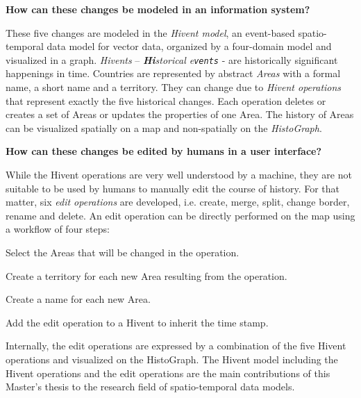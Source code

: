 \begin{description}[labelindent=0.1em]
  \item[\textbf{2a)}]
  \textbf{
    How can these changes be modeled in an information system?
  }
\end{description}

These five changes are modeled in the \emph{Hivent model}, an event-based spatio-temporal data model for vector data, organized by a four-domain model and visualized in a graph.
\emph{Hivents} -- \emph{\textbf{Hi}storical e\texttt{vents}} - are historically significant happenings in time.
Countries are represented by abstract \emph{Areas} with a formal name, a short name and a territory. They can change due to \emph{Hivent operations} that represent exactly the five historical changes. Each operation deletes or creates a set of Areas or updates the properties of one Area.
The history of Areas can be visualized spatially on a map and non-spatially on the \emph{HistoGraph}.

\begin{description}[labelindent=0.1em]
  \item[\textbf{2b)}]
  \textbf{
    How can these changes be edited by humans in a user interface?
  }
\end{description}

While the Hivent operations are very well understood by a machine, they are not suitable to be used by humans to manually edit the course of history. For that matter, six \emph{edit operations} are developed, i.e. create, merge, split, change border, rename and delete. An edit operation can be directly performed on the map using a workflow of four steps:

\begin{compactenum}
  \item Select the Areas that will be changed in the operation.
  \item Create a territory for each new Area resulting from the operation.
  \item Create a name for each new Area.
  \item Add the edit operation to a Hivent to inherit the time stamp.
\end{compactenum}

Internally, the edit operations are expressed by a combination of the five Hivent operations and visualized on the HistoGraph. The Hivent model including the Hivent operations and the edit operations are the main contributions of this Master's thesis to the research field of spatio-temporal data models.

